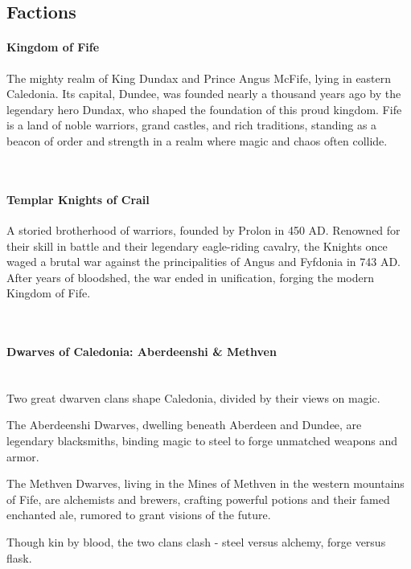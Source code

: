 \subsection*{Factions}
{\entryfont\paragraph*{Kingdom of Fife} The mighty realm of King Dundax  and Prince Angus McFife, lying in eastern Caledonia. Its capital, Dundee, was founded nearly a thousand years ago by the legendary hero Dundax, who shaped the foundation of this proud kingdom. Fife is a land of noble warriors, grand castles, and rich traditions, standing as a beacon of order and strength in a realm where magic and chaos often collide.}
\hfill\vspace*{-1.7\fontdimen6\font}\\
{\entryfont\paragraph*{Templar Knights of Crail} A storied brotherhood of warriors, founded by Prolon  in 450 AD. Renowned for their skill in battle and their legendary eagle-riding cavalry, the Knights once waged a brutal war against the principalities of Angus and Fyfdonia in 743 AD. After years of bloodshed, the war ended in unification, forging the modern Kingdom of Fife.}
\hfill\vspace*{-0.5\fontdimen6\font}\\
{\entryfont\paragraph*{Dwarves of Caledonia: Aberdeenshi \& Methven}\hfill\\Two great dwarven clans shape Caledonia, divided by their views on magic.

The Aberdeenshi Dwarves, dwelling beneath Aberdeen and Dundee, are legendary blacksmiths, binding magic to steel to forge unmatched weapons and armor.

The Methven Dwarves, living in the Mines of Methven in the western mountains of Fife, are alchemists and brewers, crafting powerful potions and their famed enchanted ale, rumored to grant visions of the future.

Though kin by blood, the two clans clash - steel versus alchemy, forge versus flask.}
\hfill\vspace*{-0.5\fontdimen6\font}\\
